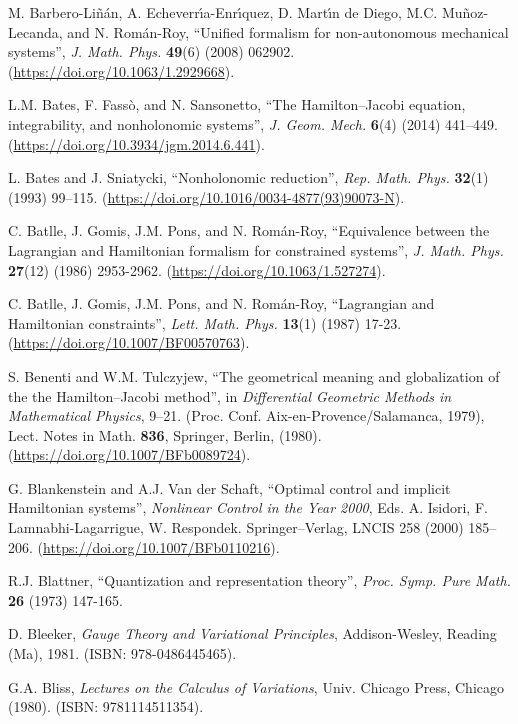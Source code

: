 \documentclass[12pt]{report}
\begin{document}
\begin{thebibliography}{999}
M. Barbero-Li\~n\'an, A. Echeverr\'\i a-Enr\'\i quez, D. Mart\'\i n de Diego, M.C. Mu\~noz-Lecanda,  and N. Rom\'an-Roy,
``Unified formalism for non-autonomous mechanical systems'',
{\sl J. Math. Phys.} \textbf{49}(6) (2008) 062902.
(\url{https://doi.org/10.1063/1.2929668}).

L.M. Bates,  F. Fass\`o, and N. Sansonetto,
``The Hamilton--Jacobi equation, integrability, and nonholonomic systems'',
\textsl{J. Geom. Mech.} \textbf{6}(4) (2014) 441--449.
(\url{https://doi.org/10.3934/jgm.2014.6.441}).

L. Bates and J. Sniatycki,
``Nonholonomic reduction'',
{\sl Rep. Math. Phys.} {\bf 32}(1) (1993) 99--115.
(\url{https://doi.org/10.1016/0034-4877(93)90073-N}).

C. Batlle, J. Gomis, J.M. Pons, and N. Rom\'an-Roy,
 ``Equivalence between the Lagrangian and Hamiltonian formalism
  for constrained systems'',
 {\sl J. Math. Phys.} {\bf 27}(12) (1986) 2953-2962.
(\url{https://doi.org/10.1063/1.527274}).

C. Batlle, J. Gomis, J.M. Pons, and N. Rom\'an-Roy,
 ``Lagrangian and Hamiltonian constraints'',
 {\sl Lett. Math. Phys.} {\bf 13}(1) (1987) 17-23.
(\url{https://doi.org/10.1007/BF00570763}).

S. Benenti and W.M. Tulczyjew, 
``The geometrical meaning and globalization of the the Hamilton--Jacobi method'',
 in  {\sl Differential Geometric Methods in Mathematical Physics}, 9--21.
(Proc. Conf. Aix-en-Provence/Salamanca, 1979), Lect. Notes in Math.
 \textbf{836}, Springer, Berlin, (1980).
\newblock (\url{https://doi.org/10.1007/BFb0089724}).

G. Blankenstein and A.J. Van der Schaft,
``Optimal control and implicit Hamiltonian systems'',
{\sl Nonlinear Control in the Year 2000}, Eds. A. Isidori, F. Lamnabhi-Lagarrigue,
W. Respondek. Springer--Verlag, LNCIS 258 (2000) 185--206.
 (\url{https://doi.org/10.1007/BFb0110216}).

R.J. Blattner, ``Quantization and representation theory'', 
{\sl Proc. Symp. Pure Math.} {\bf 26} (1973) 147-165.

D. Bleeker, 
{\it Gauge Theory and Variational Principles}, 
Addison-Wesley, Reading (Ma), 1981.
(ISBN: 978-0486445465).

G.A. Bliss, 
{\it Lectures on the Calculus of Variations},
Univ. Chicago Press, Chicago (1980).
(ISBN: 9781114511354).


\end{thebibliography}
\end{document}
